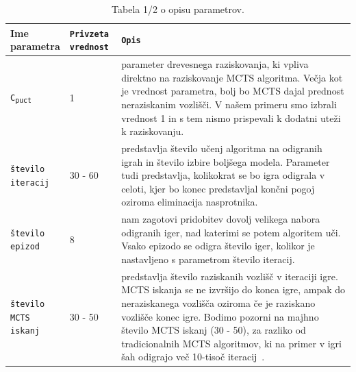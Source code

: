 \documentclass[a4paper, 12pt]{book}
\begin{document}
\begin{table}
	\begin{center}
		\begin{tabular}{p{0.15\linewidth}|p{0.15\linewidth}|p{0.7\linewidth}}
			Ime parametra                             & {\tt Privzeta vrednost} & {\tt Opis} \\ \hline
			{\tt C\textsubscript{puct}}               & 1 						& parameter drevesnega raziskovanja, ki vpliva direktno na raziskovanje MCTS algoritma. 
																				  Večja kot je vrednost parametra, bolj bo MCTS dajal prednost neraziskanim vozlišči. V našem primeru smo izbrali vrednost 1 in s tem nismo prispevali k dodatni uteži k raziskovanju.\\
			{\tt število iteracij}                    & 30 - 60					& predstavlja število učenj algoritma na odigranih igrah in število izbire boljšega modela.
																				  Parameter tudi predstavlja, kolikokrat se bo igra odigrala v celoti, kjer bo konec predstavljal končni pogoj oziroma eliminacija nasprotnika.\\
			{\tt število epizod}                      & 8 						& nam zagotovi pridobitev dovolj velikega nabora odigranih iger, nad katerimi se potem algoritem uči.
																				  Vsako epizodo se odigra število iger, kolikor je nastavljeno s parametrom število iteracij.\\
			{\tt število MCTS iskanj}                 & 30 - 50					& predstavlja število raziskanih vozlišč v iteraciji igre. 
														 						  MCTS iskanja se ne izvršijo do konca igre, ampak do neraziskanega vozlišča oziroma če je raziskano vozlišče konec igre.
														 						  Bodimo pozorni na majhno število MCTS iskanj (30 - 50), za razliko od tradicionalnih MCTS algoritmov, ki na primer v igri šah odigrajo več 10-tisoč iteracij~\cite{kohne}.\\
		
		\end{tabular}
	\end{center}
	\caption{Tabela 1/2 o opisu parametrov.}
	\label{tableParameters1}
\end{table}
\end{document}
